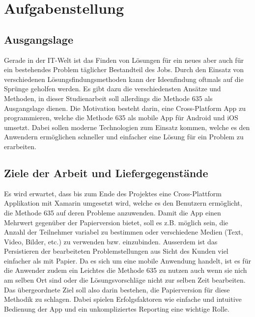 \section{Aufgabenstellung}

\subsection{Ausgangslage}
Gerade in der IT-Welt ist das Finden von Lösungen für ein neues aber auch für ein bestehendes Problem täglicher Bestandteil des Jobs. Durch den Einsatz von verschiedenen Lösungs\-findungs\-methoden kann der Ideenfindung oftmals auf die Sprünge geholfen werden. Es gibt dazu die verschiedensten Ansätze und Methoden, in dieser Studienarbeit soll allerdings die Methode 635 als Ausgangslage dienen. Die Motivation besteht darin, eine Cross-Platform App zu programmieren, welche die Methode 635 als mobile App für Android und iOS umsetzt. Dabei sollen moderne Technologien zum Einsatz kommen, welche es den Anwendern ermöglichen schneller und einfacher eine Lösung für ein Problem zu erarbeiten. 

\subsection{Ziele der Arbeit und Liefergegenstände}

Es wird erwartet, dass bis zum Ende des Projektes eine Cross-Plattform Applikation mit Xamarin umgesetzt wird, welche es den Benutzern ermöglicht, die Methode 635 auf deren Probleme anzuwenden. Damit die App einen Mehrwert gegenüber der Papierversion bietet, soll es z.B. möglich sein, die Anzahl der Teilnehmer variabel zu bestimmen oder verschiedene Medien (Text, Video, Bilder, etc.) zu verwenden bzw. einzubinden. Ausserdem ist das Persistieren der bearbeiteten Problemstellungen aus Sicht des Kunden viel einfacher als mit Papier.
Da es sich um eine mobile Anwendung handelt, ist es für die Anwender zudem ein Leichtes die Methode 635 zu nutzen auch wenn sie nich am selben Ort sind oder die Lösungsvorschläge nicht zur selben Zeit bearbeiten. 
Das übergeordnete Ziel soll also darin bestehen, die Papierversion für diese Methodik zu schlagen. Dabei spielen Erfolgsfaktoren wie einfache und intuitive Bedienung der App und ein unkompliziertes Reporting eine wichtige Rolle.
